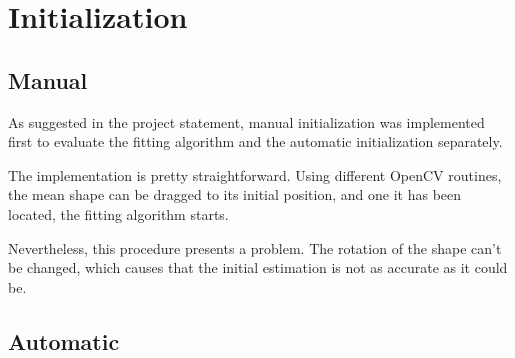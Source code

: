 \section{Initialization}

\subsection{Manual}
As suggested in the project statement, manual initialization
was implemented first to evaluate the fitting algorithm and
the automatic initialization separately.

The implementation is pretty straightforward. Using different
OpenCV routines, the mean shape can be dragged to its initial
position, and one it has been located, the fitting algorithm starts.

Nevertheless, this procedure presents a problem. The rotation of the
shape can't be changed, which causes that the initial estimation is not
as accurate as it could be.

\subsection{Automatic}

